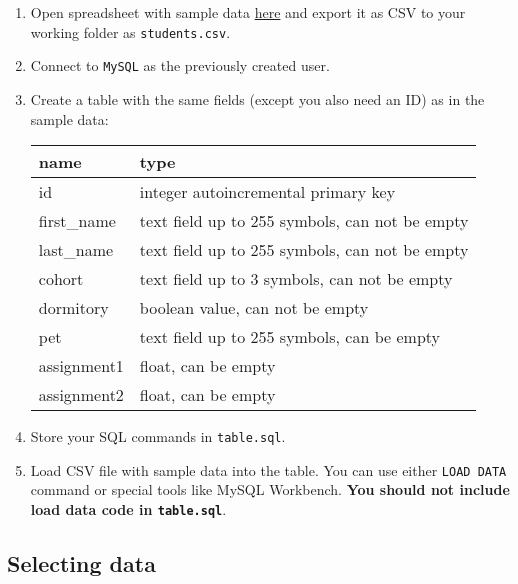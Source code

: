 \documentclass[12pt]{article}
\newcommand{\code}[1]{\texttt{#1}}
\begin{document}
\begin{enumerate}
\item Open spreadsheet with sample data \href{https://docs.google.com/spreadsheets/d/1fnpOlVMEQZJb3E07pDOHItz0ckAT2glQu6Vu9-_axvo/edit?usp=sharing}{here} and export it as CSV to your working folder as  \code{students.csv}.
\item Connect to \code{MySQL} as the previously created user.
\item Create a table with the same fields (except you also need an ID) as in the sample data:

\begin{tabular}{| l | l | }
  \hline
  \textbf{name} & \textbf{type} \\
  \hline
  id & integer autoincremental primary key \\
  first\_name & text field up to 255 symbols, can not be empty \\
  last\_name & text field up to 255 symbols, can not be empty \\
  cohort & text field up to 3 symbols, can not be empty \\
  dormitory & boolean value, can not be empty \\
  pet  & text field up to 255 symbols, can be empty \\
  assignment1  & float, can be empty \\
  assignment2  & float, can be empty \\
  \hline
\end{tabular}

\item Store your SQL commands in \code{table.sql}.

\item Load CSV file with sample data into the table. You can use either \code{LOAD DATA} command or special tools like MySQL Workbench. \textbf{You should not include load data code in \code{table.sql}}.


\end{enumerate}

\subsection*{Selecting data}
\end{document}
